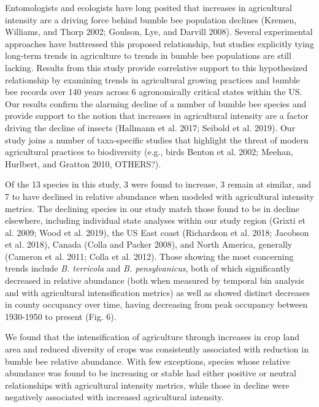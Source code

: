 \documentclass[11pt,]{article}
\begin{document}
Entomologists and ecologists have long posited that increases in
agricultural intensity are a driving force behind bumble bee population
declines (Kremen, Williams, and Thorp 2002; Goulson, Lye, and Darvill
2008). Several experimental approaches have buttressed this proposed
relationship, but studies explicitly tying long-term trends in
agriculture to trends in bumble bee populations are still lacking.
Results from this study provide correlative support to this hypothesized
relationship by examining trends in agricultural growing practices and
bumble bee records over 140 years across 6 agronomically critical states
within the US. Our results confirm the alarming decline of a number of
bumble bee species and provide support to the notion that increases in
agricultural intensity are a factor driving the decline of insects
(Hallmann et al. 2017; Seibold et al. 2019). Our study joins a number of
taxa-specific studies that highlight the threat of modern agricultural
practices to biodiversity (e.g., birds Benton et al. 2002; Meehan,
Hurlbert, and Gratton 2010, OTHERS?).

Of the 13 species in this study, 3 were found to increase, 3 remain at
similar, and 7 to have declined in relative abundance when modeled with
agricultural intensity metrics. The declining species in our study match
those found to be in decline elsewhere, including individual state
analyses within our study region (Grixti et al. 2009; Wood et al. 2019),
the US East coast (Richardson et al. 2018; Jacobson et al. 2018), Canada
(Colla and Packer 2008), and North America, generally (Cameron et al.
2011; Colla et al. 2012). Those showing the most concerning trends
include \emph{B. terricola} and \emph{B. pensylvanicus}, both of which
significantly decreased in relative abundance (both when measured by
temporal bin analysis and with agricultural intensification metrics) as
well as showed distinct decreases in county occupancy over time, having
decreasing from peak occupancy between 1930-1950 to present (Fig. 6).

We found that the intensification of agriculture through increases in
crop land area and reduced diversity of crops was consistently
associated with reduction in bumble bee relative abundance. With few
exceptions, species whose relative abundance was found to be increasing
or stable had either positive or neutral relationships with agricultural
intensity metrics, while those in decline were negatively associated
with increased agricultural intensity.
\end{document}
